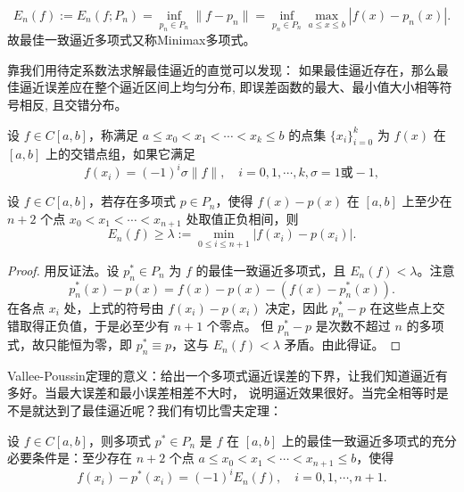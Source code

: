 \begin{equation}
    E_n(f) := E_n(f; P_n) = \inf_{p_n \in P_n} \|f - p_n\| =
    \inf_{p_n \in P_n} \max_{a \le x \le b} |f(x) - p_n(x)|.
\end{equation}
故最佳一致逼近多项式又称Minimax多项式。

靠我们用待定系数法求解最佳逼近的直觉可以发现：
如果最佳逼近存在，那么最佳逼近误差应在整个逼近区间上均匀分布, 即误差函数的最大、最小值大小相等符号相反, 且交错分布。

\begin{definition}
    设 \(f \in C[a, b]\)，称满足 \(a \le x_0 < x_1 < \cdots < x_k \le b\)
    的点集 \(\{x_i\}_{i=0}^k\) 为 \(f(x)\) 在 \([a, b]\) 上的交错点组，如果它满足
    \begin{equation}
        f(x_i) = (-1)^i \sigma \|f\|, \quad i = 0, 1, \cdots, k,
        \sigma = 1 \text{或} -1,
    \end{equation}
\end{definition}
\begin{theorem}
    设 \(f\in C[a,b]\)，若存在多项式 \(p\in P_n\)，使得
    \(f(x)-p(x)\) 在 \([a,b]\) 上至少在 \(n+2\) 个点
    \(x_0<x_1<\cdots<x_{n+1}\) 处取值正负相间，则
    \[
        E_n(f)\ge \lambda:=\min_{0\le i\le n+1}|f(x_i)-p(x_i)|.
    \]
\end{theorem}

\begin{proof}
    用反证法。设 \(p_n^*\in P_n\) 为 \(f\) 的最佳一致逼近多项式，且
    \(E_n(f)<\lambda\)。注意
    \[
        p_n^*(x)-p(x)=f(x)-p(x)-(f(x)-p_n^*(x)).
    \]
    在各点 \(x_i\) 处，上式的符号由 \(f(x_i)-p(x_i)\) 决定，因此
    \(p_n^*-p\) 在这些点上交错取得正负值，于是必至少有 \(n+1\) 个零点。
    但 \(p_n^*-p\) 是次数不超过 \(n\) 的多项式，故只能恒为零，即
    \(p_n^*\equiv p\)，这与 \(E_n(f)<\lambda\) 矛盾。由此得证。
\end{proof}
Vallee-Poussin定理的意义：给出一个多项式逼近误差的下界，让我们知道逼近有多好。当最大误差和最小误差相差不大时，
说明逼近效果很好。当完全相等时是不是就达到了最佳逼近呢？我们有切比雪夫定理：
\begin{theorem}[Chebyshev 定理]
    设 \(f \in C[a, b]\)，则多项式 \(p^* \in P_n\) 是 \(f\) 在 \([a, b]\)
    上的最佳一致逼近多项式的充分必要条件是：至少存在
    \(n+2\) 个点 \(a \le x_0 < x_1 < \cdots < x_{n+1} \le b\)，使得
    \begin{equation}
        f(x_i) - p^*(x_i) = (-1)^i E_n(f), \quad i = 0, 1, \cdots,
        n+1.
    \end{equation}
\end{theorem}

